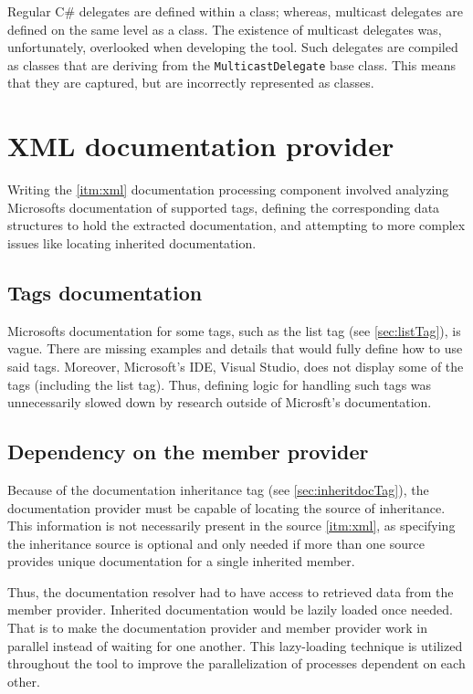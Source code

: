 Regular C\# delegates are defined within a class; whereas, multicast delegates are defined on the same level as a class.
The existence of multicast delegates was, unfortunately, overlooked when developing the tool.
Such delegates are compiled as classes that are deriving from the \lstinline[language=csh]{MulticastDelegate} base class.
This means that they are captured, but are incorrectly represented as classes.

\section{XML documentation provider}

Writing the \ref{itm:xml} documentation processing component involved analyzing Microsofts documentation of supported tags, defining the corresponding data structures to hold the extracted documentation, and attempting to more complex issues like locating inherited documentation.

\subsection{Tags documentation}

Microsofts documentation for some tags, such as the list tag (see \ref{sec:listTag}), is vague. There are missing examples and details that would fully define how to use said tags. Moreover, Microsoft's IDE, Visual Studio, does not display some of the tags (including the list tag). Thus, defining logic for handling such tags was unnecessarily slowed down by research outside of Microsft's documentation.

\subsection{Dependency on the member provider}

Because of the documentation inheritance tag (see \ref{sec:inheritdocTag}), the documentation provider must be capable of locating the source of inheritance. This information is not necessarily present in the source \ref{itm:xml}, as specifying the inheritance source is optional and only needed if more than one source provides unique documentation for a single inherited member.

Thus, the documentation resolver had to have access to retrieved data from the member provider. Inherited documentation would be lazily loaded once needed. That is to make the documentation provider and member provider work in parallel instead of waiting for one another. This lazy-loading technique is utilized throughout the tool to improve the parallelization of processes dependent on each other.

